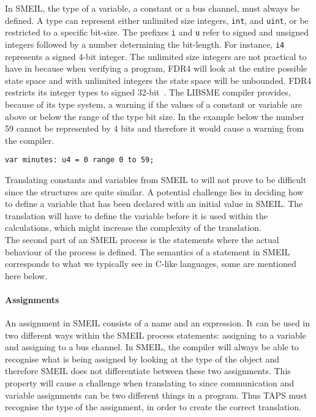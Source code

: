 In SMEIL, the type of a variable, a constant or a bus channel, must always be defined. A type can represent either unlimited size integers, \texttt{int}, and \texttt{uint}, or be restricted to a specific bit-size. The prefixes \texttt{i} and \texttt{u} refer to signed and unsigned integers followed by a number determining the bit-length. For instance, \texttt{i4} represents a signed 4-bit integer. The unlimited size integers are not practical to have in \cspm{} because when verifying a program, FDR4 will look at the entire possible state space and with unlimited integers the state space will be unbounded. FDR4 restricts its integer types to signed 32-bit~\cite{UniversityofOxford}. The LIBSME compiler provides, because of its type system, a warning if the values of a constant or variable are above or below the range of the type bit size. In the example below the number 59 cannot be represented by 4 bits and therefore it would cause a warning from the compiler.\\
\begin{verbatim}
var minutes: u4 = 0 range 0 to 59;
\end{verbatim}

Translating constants and variables from SMEIL to \cspm{} will not prove to be difficult since the structures are quite similar.
A potential challenge lies in deciding how to define a variable that has been declared with an initial value in SMEIL. The \cspm{} translation will have to define the variable before it is used within the calculations, which might increase the complexity of the translation.\\

The second part of an SMEIL process is the statements where the actual behaviour of the process is defined. The semantics of a statement in SMEIL corresponds to what we typically see in C-like languages, some are mentioned here below.
\paragraph{Assignments}
An assignment in SMEIL consists of a name and an expression. It can be used in two different ways within the SMEIL process statements: assigning to a variable and assigning to a bus channel. In SMEIL, the compiler will always be able to recognise what is being assigned by looking at the type of the object and therefore SMEIL does not differentiate between these two assignments. This property will cause a challenge when translating to \cspm{} since communication and variable assignments can be two different things in a \cspm{} program. Thus TAPS must recognise the type of the assignment, in order to create the correct translation.
